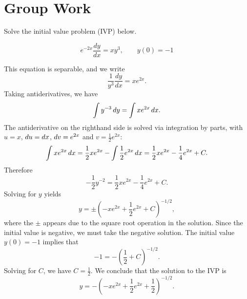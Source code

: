 \documentclass[]{ximera}
\begin{document}
\section{Group Work}
\begin{problem}
Solve the initial value problem (IVP) below.  

\[
e^{-2x} \frac{dy}{dx} = xy^3, \qquad y(0)=-1
\]

\begin{solution}
This equation is separable, and we write
$$
\frac{1}{y^3} \frac{dy}{dx} = x e^{2x}. 
$$
Taking antiderivatives, we have
$$
\int y^{-3} \mathop{}\!d y = \int x e^{2x} \mathop{}\!d x.
$$
The antiderivative on the righthand side is solved via integration by parts, with $u=x$, $\mathop{}\!d u = \mathop{}\!d x$, $\mathop{}\!d v = e^{2x}$ and $v = \frac{1}{2}e^{2x}$:
$$
\int x e^{2x} \mathop{}\!d x = \frac{1}{2} x e^{2x} - \int \frac{1}{2} e^{2x} \mathop{}\!d x = \frac{1}{2} x e^{2x} - \frac{1}{4} e^{2x} + C.
$$
Therefore
$$
-\frac{1}{2} y^{-2} = \frac{1}{2} x e^{2x} - \frac{1}{4} e^{2x} + C.
$$
Solving for $y$ yields
$$
y = \pm \left(-x e^{2x} + \frac{1}{2} e^{2x} + C\right)^{-1/2},
$$
where the $\pm$ appears due to the square root operation in the solution. Since the initial value is negative, we must take the negative solution. The initial value $y(0)=-1$ implies that
$$
-1 = -\left(\frac{1}{2} + C \right)^{-1/2}.
$$
Solving for $C$, we have $C = \frac{1}{2}$. We conclude that the solution to the IVP is 
$$
y = -\left(-x e^{2x} + \frac{1}{2} e^{2x} + \frac{1}{2}\right)^{-1/2}.
$$
\end{solution}
\end{problem}


\end{document}
